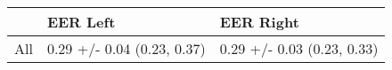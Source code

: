 \begin{tabular}{lll}
\toprule
{} &                    EER Left &                   EER Right \\
\midrule
All &  0.29 +/- 0.04 (0.23, 0.37) &  0.29 +/- 0.03 (0.23, 0.33) \\
\bottomrule
\end{tabular}

